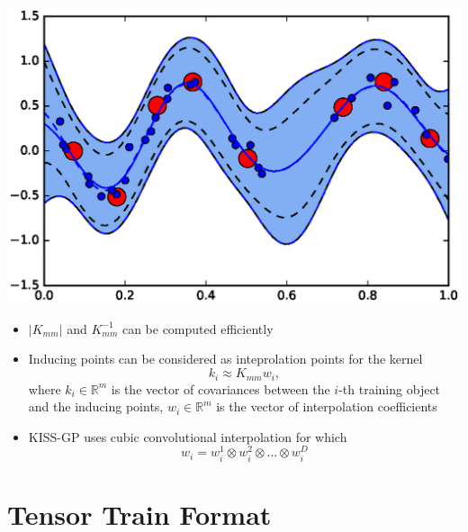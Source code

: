 \documentclass[a0,portrait]{a0poster}
\newcommand{\R}{\mathbb{R}}
\begin{document}
\begin{multicols}{2}
\begin{itemize}
\end{itemize}
\begin{minipage}[b]{0.45\linewidth}

  \begin{center}
    \includegraphics[width=1.\linewidth]{pics/gps/1d_gp_ind_inputs.eps}
  \end{center}

  \vspace{-1cm}
\end{minipage}
\begin{minipage}[b]{0.5\linewidth}
  \begin{center}
    \centering
    \scalebox{1.25}{
      
    }
  \end{center}
\end{minipage}
    
    \begin{itemize}
      \item $|K_{mm}|$ and $K_{mm}^{-1}$ can be computed efficiently
      \item Inducing points can be considered as inteprolation points for the
        kernel
        \[
          k_i \approx K_{mm} w_i,
        \]
      where $k_i \in \R^m$ is the vector of covariances between the $i$-th training
      object and the inducing points, $w_i\in \R^{m}$ is the vector of interpolation coefficients

      \item KISS-GP uses cubic convolutional interpolation for which 
        \[
          w_i = w_i^1 \otimes w_i^2 \otimes \ldots \otimes w_i^D
        \]
\end{itemize}

\section*{\LARGE \color{NavyBlue} Tensor Train Format}


\end{multicols}
\end{document}
